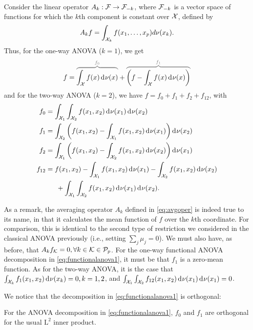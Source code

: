 \documentclass[a4paper,showframe,11pt,draft]{report}
\begin{document}
Consider the linear operator $A_k:{\mathcal F}\to {\mathcal F}_{-k}$, where ${\mathcal F}_{-k}$ is a vector space of functions for which the $k$th component is constant over ${\mathcal X}$, defined by
\begin{align}\label{eq:avgoper}
  A_k f = \int_{{\mathcal X}_k} f(x_1,\dots,x_p) d\nu(x_k).
\end{align}
Thus, for the one-way ANOVA ($k=1$), we get
\begin{align}\label{eq:functionalanova1}
  f = 
  \greyoverbrace{\int_\cX f(x)\d\nu(x)}{f_0} 
  + 
  \greyoverbrace{\left( f - \int_\cX f(x)\d\nu(x) \right)}{f_1}
\end{align}
and for the two-way ANOVA ($k=2$), we have $f = f_0 + f_1 + f_2 + f_{12}$, with
\begin{align*}
  f_0 &= \int_{\cX_1}\int_{\cX_2} f(x_1,x_2) \d\nu(x_1)\d\nu(x_2) \\
  f_1 &= \int_{\cX_2} \left( f(x_1,x_2) - \int_{\cX_1} f(x_1,x_2) \d\nu(x_1) \right) \d\nu(x_2)\\  
  f_2 &= \int_{\cX_1} \left( f(x_1,x_2) - \int_{\cX_2} f(x_1,x_2) \d\nu(x_2) \right) \d\nu(x_1)\\  
  f_{12} &= f(x_1,x_2) - \int_{\cX_1} f(x_1,x_2) \d\nu(x_1) - \int_{\cX_2} f(x_1,x_2) \d\nu(x_2) \\
  &\phantom{==} + \int_{\cX_1}\int_{\cX_2} f(x_1,x_2) \d\nu(x_1)\d\nu(x_2).
\end{align*}

As a remark, the averaging operator $A_k$ defined in \eqref{eq:avgoper} is indeed true to its name, in that it calculates the mean function of $f$ over the $k$th coordinate. 
For comparison, this is identical to the second type of restriction we considered in the classical ANOVA previously (i.e., setting $\sum_j \mu_j = 0$).
We must also have, as before, that $A_kf_{\mathcal K} = 0, \forall k \in {\mathcal K} \in {\mathcal P}_p$.
For the one-way functional ANOVA decomposition in \eqref{eq:functionalanova1}, it must be that $f_1$ is a zero-mean function.
As for the two-way ANOVA, it is the case that $\int_{{\mathcal X}_k} f_1(x_1,x_2) \operatorname{d\!\:\!}\nu(x_k) = 0, k=1,2$, and $\int_{{\mathcal X}_1}\int_{{\mathcal X}_2} f_{12}(x_1,x_2) \operatorname{d\!\:\!}\nu(x_1)\operatorname{d\!\:\!}\nu(x_1) = 0$.

We notice that the decomposition in \eqref{eq:functionalanova1} is orthogonal:

\begin{claim}
  For the ANOVA decomposition in \eqref{eq:functionalanova1}, $f_0$ and $f_1$ are orthogonal for the usual $\text{L}^2$ inner product.
\end{claim}
\end{document}
